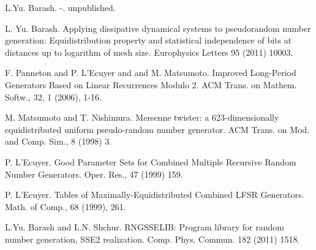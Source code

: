 
\begin{thebibliography}{10}

{\sc L.Yu. Barash}. {-}. unpublished.



{\sc L. Yu. Barash}. {Applying dissipative dynamical systems to pseudorandom number generation: Equidistribution property and statistical independence of bits at distances up to logarithm of mesh size}. Europhysics Letters 95 (2011) 10003.



{\sc F. Panneton and P. L'Ecuyer and and M. Matsumoto}. {Improved Long-Period Generators Based on Linear Recurrences Modulo 2}. ACM Trans. on Mathem. Softw., 32, 1 (2006), 1-16.



{\sc M. Matsumoto and T. Nishimura}. {Mersenne twister: a 623-dimensionally equidistributed uniform pseudo-random number generator}. ACM Trans. on Mod. and Comp. Sim., 8 (1998) 3.



{\sc P. L'Ecuyer}. {Good Parameter Sets for Combined Multiple Recursive Random Number Generators}. Oper. Res., 47 (1999) 159.



{\sc P. L'Ecuyer}. {Tables of Maximally-Equidistributed Combined LFSR Generators}. Math. of Comp., 68 (1999), 261.



{\sc L.Yu. Barash and L.N. Shchur}. {RNGSSELIB: Program library for random number generation, SSE2 realization}. Comp. Phys. Commun. 182 (2011) 1518.

\end{thebibliography}
